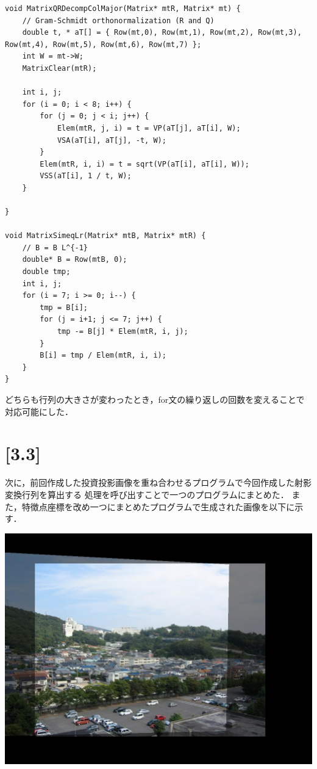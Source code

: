 \documentclass[11pt]{jarticle}
\begin{document}
\begin{lstlisting}
void MatrixQRDecompColMajor(Matrix* mtR, Matrix* mt) {
    // Gram-Schmidt orthonormalization (R and Q)
    double t, * aT[] = { Row(mt,0), Row(mt,1), Row(mt,2), Row(mt,3), Row(mt,4), Row(mt,5), Row(mt,6), Row(mt,7) };
    int W = mt->W;
    MatrixClear(mtR);

    int i, j;
    for (i = 0; i < 8; i++) {
        for (j = 0; j < i; j++) {
            Elem(mtR, j, i) = t = VP(aT[j], aT[i], W);
            VSA(aT[i], aT[j], -t, W);
        }
        Elem(mtR, i, i) = t = sqrt(VP(aT[i], aT[i], W));
        VSS(aT[i], 1 / t, W);
    }

}

void MatrixSimeqLr(Matrix* mtB, Matrix* mtR) {
    // B = B L^{-1}
    double* B = Row(mtB, 0);
    double tmp;
    int i, j;
    for (i = 7; i >= 0; i--) {
        tmp = B[i];
        for (j = i+1; j <= 7; j++) {
            tmp -= B[j] * Elem(mtR, i, j);
        }
        B[i] = tmp / Elem(mtR, i, i);
    }
}
\end{lstlisting}

どちらも行列の大きさが変わったとき，for文の繰り返しの回数を変えることで対応可能にした．

\section{[3.3]}

次に，前回作成した投資投影画像を重ね合わせるプログラムで今回作成した射影変換行列を算出する
処理を呼び出すことで一つのプログラムにまとめた．
また，特徴点座標を改め一つにまとめたプログラムで生成された画像を以下に示す．

\includegraphics[scale=.4]{./img/out.jpg}
\end{document}
